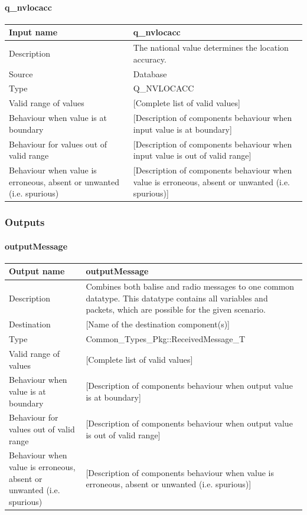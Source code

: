 \paragraph{q\_nvlocacc}

\begin{longtable}{p{}p{}}
\toprule
Input name				& q\_nvlocacc \\
\midrule
Description				& The national value determines the location accuracy. \\
\midrule
Source					& Database \\ 
\midrule
Type					& Q\_NVLOCACC \\
\midrule
Valid range of values	& [Complete list of valid values] \\
\midrule
Behaviour when value is at boundary	& [Description of components behaviour when input value is at boundary] \\
\midrule
Behaviour for values out of valid range	& [Description of components behaviour when input value is out of valid range] \\
\midrule
Behaviour when value is erroneous, absent or unwanted (i.e. spurious) & [Description of components behaviour when value is erroneous, absent or unwanted (i.e. spurious)] \\
\bottomrule
\end{longtable}



\subsubsection{Outputs}\label{s:Manage_Trackside_outputs}

\paragraph{outputMessage}

\begin{longtable}{p{}p{}}
\toprule
Output name				& outputMessage \\
\midrule
Description				& Combines both balise and radio messages to one common datatype. This datatype contains all variables and packets, which are possible for the given scenario. \\
\midrule
Destination				& [Name of the destination component(s)] \\ 
\midrule
Type					& Common\_Types\_Pkg::ReceivedMessage\_T \\
\midrule
Valid range of values	& [Complete list of valid values] \\
\midrule
Behaviour when value is at boundary	& [Description of components behaviour when output value is at boundary] \\
\midrule
Behaviour for values out of valid range	& [Description of components behaviour when output value is out of valid range] \\
\midrule
Behaviour when value is erroneous, absent or unwanted (i.e. spurious) & [Description of components behaviour when value is erroneous, absent or unwanted (i.e. spurious)] \\
\bottomrule
\end{longtable}


